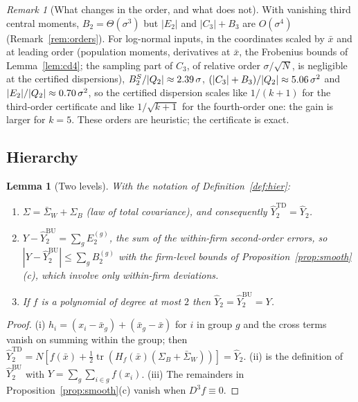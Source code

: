\documentclass[10pt,a4paper]{article}
\theoremstyle{plain}
\newtheorem{lemma}[theorem]{Lemma}
\theoremstyle{definition}
\theoremstyle{remark}
\newtheorem{remark}[theorem]{Remark}
\newcommand{\tr}{\operatorname{tr}}
\newcommand{\Yh}{\widehat{Y}}
\newcommand{\Hf}{H_f}
\begin{document}
\begin{remark}[What changes in the order, and what does not]\label{rem:sharporders}
With vanishing third central moments, $B_2=\Theta(\sigma^3)$ but $|E_2|$ and $|C_3|+B_3$ are $O(\sigma^4)$ (Remark~\ref{rem:orders}). For log-normal inputs, in the coordinates scaled by $\bar x$ and at leading order (population moments, derivatives at $\bar x$, the Frobenius bounds of Lemma~\ref{lem:cd4}; the sampling part of $C_3$, of relative order $\sigma/\sqrt N$, is negligible at the certified dispersions), $B_2^S/|Q_2|\approx2.39\,\sigma$, $(|C_3|+B_3)/|Q_2|\approx5.06\,\sigma^2$ and $|E_2|/|Q_2|\approx0.70\,\sigma^2$, so the certified dispersion scales like $1/(k+1)$ for the third-order certificate and like $1/\sqrt{k+1}$ for the fourth-order one: the gain is larger for $k=5$. These orders are heuristic; the certificate is exact.
\end{remark}

\subsection{Hierarchy}

\begin{lemma}[Two levels]\label{lem:hier}
With the notation of Definition~\ref{def:hier}:
\begin{enumerate}[label=(\roman*),leftmargin=2em]
\item $\Sigma=\bar\Sigma_W+\Sigma_B$ (law of total covariance), and consequently $\Yh_2^{\mathrm{TD}}=\Yh_2$.
\item $Y-\Yh_2^{\mathrm{BU}}=\sum_gE_2^{(g)}$, the sum of the within-firm second-order errors, so $|Y-\Yh_2^{\mathrm{BU}}|\le\sum_gB_2^{(g)}$ with the firm-level bounds of Proposition~\ref{prop:smooth}(c), which involve only within-firm deviations.
\item If $f$ is a polynomial of degree at most $2$ then $\Yh_2=\Yh_2^{\mathrm{BU}}=Y$.
\end{enumerate}
\end{lemma}
\begin{proof}
(i) $h_i=(x_i-\bar x_g)+(\bar x_g-\bar x)$ for $i$ in group $g$ and the cross terms vanish on summing within the group; then $\Yh_2^{\mathrm{TD}}=N[f(\bar x)+\frac12\tr(\Hf(\bar x)(\Sigma_B+\bar\Sigma_W))]=\Yh_2$. (ii) is the definition of $\Yh_2^{\mathrm{BU}}$ with $Y=\sum_g\sum_{i\in g}f(x_i)$. (iii) The remainders in Proposition~\ref{prop:smooth}(c) vanish when $D^3\!f\equiv0$.
\end{proof}
\end{document}
